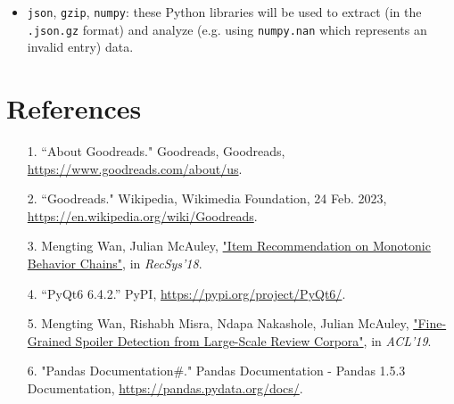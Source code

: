 \documentclass[fontsize=11pt]{article}
\begin{document}
\begin{itemize}
\begin{itemize}
\item \texttt{json}, \texttt{gzip}, \texttt{numpy}: these Python libraries will be used to extract (in the \texttt{.json.gz} format) and analyze (e.g. using \texttt{numpy.nan} which represents an invalid entry) data.


\end{itemize}
\end{itemize}

\section*{References}

\begin{enumerate}
    \item[1.]
    ``About Goodreads." Goodreads, Goodreads, \url{https://www.goodreads.com/about/us}.
    \item[2.]
    ``Goodreads." Wikipedia, Wikimedia Foundation, 24 Feb. 2023, \url{https://en.wikipedia.org/wiki/Goodreads}. 
    \item[3.]
    Mengting Wan, Julian McAuley, \href{https://www.google.com/url?q=https%3A%2F%2Fgithub.com%2FMengtingWan%2Fmengtingwan.github.io%2Fraw%2Fmaster%2Fpaper%2Frecsys18_mwan.pdf&sa=D&sntz=1&usg=AOvVaw0HcX6gU1ENhk7fbCXXbCiy}{"Item Recommendation on Monotonic Behavior Chains"}, in \textit{RecSys'18}.
    \item[4.]
    “PyQt6 6.4.2.” PyPI, \url{https://pypi.org/project/PyQt6/}.
    \item[5.]
    Mengting Wan, Rishabh Misra, Ndapa Nakashole, Julian McAuley, \href{https://www.google.com/url?q=https%3A%2F%2Fwww.aclweb.org%2Fanthology%2FP19-1248&sa=D&sntz=1&usg=AOvVaw1G1ZlQ7oe0NDtqeI8gN2Nf}{"Fine-Grained Spoiler Detection from Large-Scale Review Corpora"}, in \textit{ACL'19}.
    \item[6.]
    "Pandas Documentation\#." Pandas Documentation - Pandas 1.5.3 Documentation, \url{https://pandas.pydata.org/docs/}.
\end{enumerate}
\end{document}
